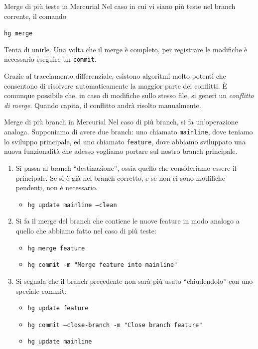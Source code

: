 \documentclass[presentation]{beamer}
\begin{document}
\begin{frame}{Merge di più teste in Mercurial}
	Nel caso in cui vi siano più teste nel branch corrente, il comando
	\begin{center}
		\texttt{hg merge}
	\end{center}
	Tenta di unirle.
	Una volta che il merge è completo, per registrare le modifiche è necessario eseguire un \texttt{commit}.

	Grazie al tracciamento differenziale, esistono algoritmi molto potenti che consentono di risolvere automaticamente la maggior parte dei conflitti. È comunque possibile che, in caso di modifiche sullo stesso file, si generi un \emph{conflitto di merge}. Quando capita, il conflitto andrà risolto manualmente.
\end{frame}

\begin{frame}{Merge di più branch in Mercurial}
	Nel caso di più branch, si fa un'operazione analoga. Supponiamo di avere due branch: uno chiamato \texttt{mainline}, dove teniamo lo sviluppo principale, ed uno chiamato \texttt{feature}, dove abbiamo sviluppato una nuova funzionalità che adesso vogliamo portare sul nostro branch principale.
	\begin{enumerate}
	 \item Si passa al branch ``destinazione'', ossia quello che consideriamo essere il principale. Se si è già nel branch corretto, e se non ci sono modifiche pendenti, non è necessario.
		\begin{itemize}
			\item \texttt{hg update mainline --clean}
		\end{itemize}
	 \item Si fa il merge del branch che contiene le nuove feature in modo analogo a quello che abbiamo fatto nel caso di più teste:
		\begin{itemize}
			\item \texttt{hg merge feature}
			\item \texttt{hg commit -m "Merge feature into mainline"}
		\end{itemize}
	 \item Si segnala che il branch precedente non sarà più usato ``chiudendolo'' con uno speciale commit:
		\begin{itemize}
			\item \texttt{hg update feature}
			\item \texttt{hg commit --close-branch -m "Close branch feature"}
			\item \texttt{hg update mainline}
		\end{itemize}
	\end{enumerate}
\end{frame}
\end{document}
